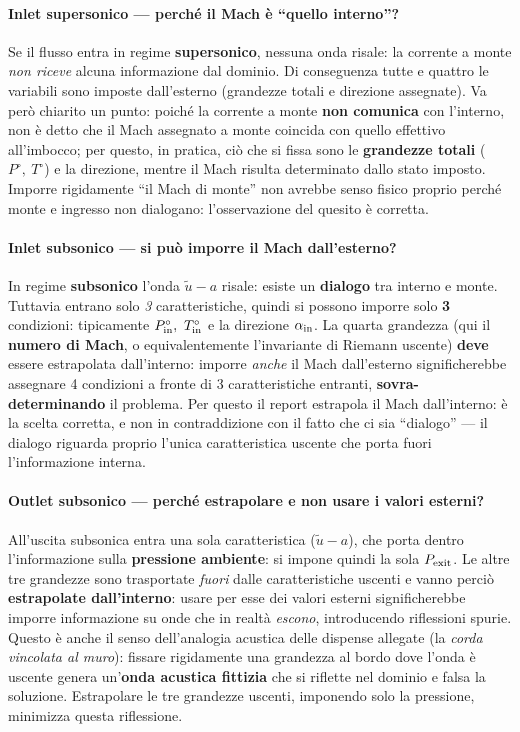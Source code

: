 \paragraph{Inlet supersonico --- perché il Mach è ``quello interno''?}
Se il flusso entra in regime \textbf{supersonico}, nessuna onda risale: la corrente a
monte \emph{non riceve} alcuna informazione dal dominio. Di conseguenza tutte e quattro
le variabili sono imposte dall'esterno (grandezze totali e direzione assegnate). Va
però chiarito un punto: poiché la corrente a monte \textbf{non comunica} con
l'interno, non è detto che il Mach assegnato a monte coincida con quello effettivo
all'imbocco; per questo, in pratica, ciò che si fissa sono le \textbf{grandezze totali}
($P^\circ,\ T^\circ$) e la direzione, mentre il Mach risulta determinato dallo stato
imposto. Imporre rigidamente ``il Mach di monte'' non avrebbe senso fisico proprio
perché monte e ingresso non dialogano: l'osservazione del quesito è corretta.

\paragraph{Inlet subsonico --- si può imporre il Mach dall'esterno?}
In regime \textbf{subsonico} l'onda $\tilde u - a$ risale: esiste un \textbf{dialogo}
tra interno e monte. Tuttavia entrano solo \emph{3} caratteristiche, quindi si possono
imporre solo \textbf{3} condizioni: tipicamente $P^\circ_{\rm in},\ T^\circ_{\rm in}$ e
la direzione $\alpha_{\rm in}$. La quarta grandezza (qui il \textbf{numero di Mach}, o
equivalentemente l'invariante di Riemann uscente) \textbf{deve} essere estrapolata
dall'interno: imporre \emph{anche} il Mach dall'esterno significherebbe assegnare 4
condizioni a fronte di 3 caratteristiche entranti, \textbf{sovra-determinando} il
problema. Per questo il report estrapola il Mach dall'interno: è la scelta corretta, e
non in contraddizione con il fatto che ci sia ``dialogo'' --- il dialogo riguarda
proprio l'unica caratteristica uscente che porta fuori l'informazione interna.

\paragraph{Outlet subsonico --- perché estrapolare e non usare i valori esterni?}
All'uscita subsonica entra una sola caratteristica ($\tilde u - a$), che porta dentro
l'informazione sulla \textbf{pressione ambiente}: si impone quindi la sola
$P_{\rm exit}$. Le altre tre grandezze sono trasportate \emph{fuori} dalle
caratteristiche uscenti e vanno perciò \textbf{estrapolate dall'interno}: usare per
esse dei valori esterni significherebbe imporre informazione su onde che in realtà
\emph{escono}, introducendo riflessioni spurie. Questo è anche il senso dell'analogia
acustica delle dispense allegate (la \emph{corda vincolata al muro}): fissare
rigidamente una grandezza al bordo dove l'onda è uscente genera un'\textbf{onda
acustica fittizia} che si riflette nel dominio e falsa la soluzione. Estrapolare le tre
grandezze uscenti, imponendo solo la pressione, minimizza questa riflessione.

